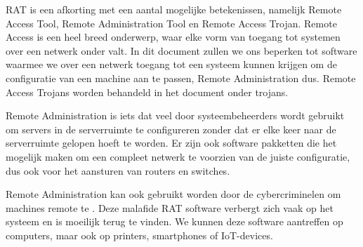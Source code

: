 RAT is een afkorting met een aantal mogelijke betekenissen, namelijk Remote Access Tool, Remote Administration Tool en Remote Access Trojan. Remote Access is een heel breed onderwerp, waar elke vorm van toegang tot systemen over een netwerk onder valt. In dit document zullen we ons beperken tot software waarmee we over een netwerk toegang tot een systeem kunnen krijgen om de configuratie van een machine aan te passen, Remote Administration dus. Remote Access Trojans worden behandeld in het  document onder trojans.

Remote Administration is iets dat veel door systeembeheerders wordt gebruikt om servers in de serverruimte te configureren zonder dat er elke keer naar de serverruimte gelopen hoeft te worden. Er zijn ook software pakketten die het mogelijk maken om een compleet netwerk te voorzien van de juiste configuratie, dus ook voor het aansturen van routers en switches.

Remote Administration kan ook gebruikt worden door de cybercriminelen om machines remote te . Deze malafide RAT software verbergt zich vaak op het systeem en is moeilijk terug te vinden. We kunnen deze software aantreffen op computers, maar ook op printers, smartphones of IoT-devices.

